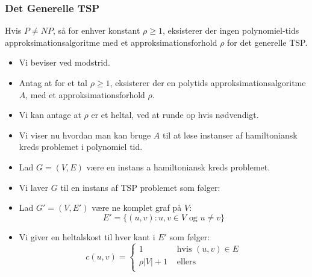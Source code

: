 \begin{frame}[allowframebreaks]
	\frametitle{Det Generelle TSP}
	\begin{theorem}
		Hvis $P \ne NP$, så for enhver konstant \(\rho \ge 1\), eksisterer der ingen polynomiel-tids approksimationsalgoritme med et approksimationsforhold \(\rho\) for det generelle TSP.
	\end{theorem}
	\begin{itemize}
		\item Vi beviser ved modstrid.
		\item Antag at for et tal \(\rho \ge 1\), eksisterer der en polytids approksimationsalgoritme $A$, med et approksimationsforhold \(\rho\).
		\item Vi kan antage at \(\rho\) er et heltal, ved at runde op hvis nødvendigt.
		\item Vi viser nu hvordan man kan bruge $A$ til at løse instanser af hamiltoniansk kreds problemet i polynomiel tid.
		\item Lad $G = (V,E)$ være en instans a hamiltoniansk kreds problemet.
		\item Vi laver $G$ til en instans af TSP problemet som følger:

		\item Lad $G' = (V, E')$ være ne komplet graf på $V$:
		      \begin{equation}
			      E' = \{(u,v) : u, v \in V \text{ og } u \ne v\}
		      \end{equation}

		\item Vi giver en heltalskost til hver kant i $E'$ som følger:
		      \begin{equation*}
			      c(u,v) =
			      \begin{cases}
				      1           & \text{ hvis } (u,v) \in E \\
				      \rho |V| +1 & \text{ ellers}            \\
			      \end{cases}
		      \end{equation*}


\end{itemize}
\end{frame}

